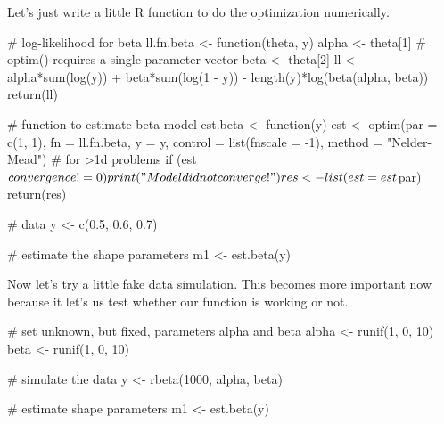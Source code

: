 \documentclass{beamer}
\begin{document}
\begin{frame}[fragile]
Let's just write a little R function to do the optimization numerically.
\begin{scriptsize}
\pause \begin{blockcode} 
# log-likelihood for beta
ll.fn.beta <- function(theta, y) {
  alpha <- theta[1]  # optim() requires a single parameter vector
  beta <- theta[2]
  ll <- alpha*sum(log(y)) + beta*sum(log(1 - y)) - 
           length(y)*log(beta(alpha, beta))
  return(ll)
}
\end{blockcode}

\pause \begin{blockcode}
# function to estimate beta model
est.beta <- function(y) {
  est <- optim(par = c(1, 1), fn = ll.fn.beta, y = y,
               control = list(fnscale = -1),
               method = "Nelder-Mead") # for >1d problems
  if (est$convergence != 0) print("Model did not converge!")
  res <- list(est = est$par)
  return(res)
}
\end{blockcode}

\pause \begin{blockcode}
# data
y <- c(0.5, 0.6, 0.7)

# estimate the shape parameters
m1 <- est.beta(y)
\end{blockcode}
\end{scriptsize}
\end{frame}

\begin{frame}[fragile]
Now let's try a little fake data simulation. This becomes more important now because it let's us test whether our function is working or not.
\pause \begin{blockcode}
# set unknown, but fixed, parameters alpha and beta
alpha <- runif(1, 0, 10)
beta <- runif(1, 0, 10)
\end{blockcode}

\pause \begin{blockcode}
# simulate the data
y <- rbeta(1000, alpha, beta)
\end{blockcode}

\pause \begin{blockcode}
# estimate shape parameters
m1 <- est.beta(y)
\end{blockcode}
\end{frame}

\end{document}
